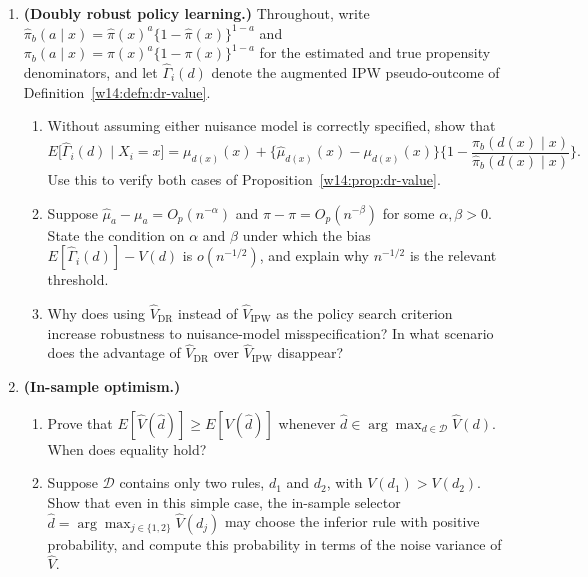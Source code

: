 \documentclass[master.tex]{subfiles}
\begin{document}
\begin{enumerate}
    \item \textbf{(Doubly robust policy learning.)}
    Throughout, write \(\hat\pi_b(a\mid x)=\hat\pi(x)^a\{1-\hat\pi(x)\}^{1-a}\)
    and \(\pi_b(a\mid x)=\pi(x)^a\{1-\pi(x)\}^{1-a}\) for the estimated and
    true propensity denominators, and let \(\hat\Gamma_i(d)\) denote the
    augmented IPW pseudo-outcome of Definition~\ref{w14:defn:dr-value}.
    \begin{enumerate}
        \item[(a)] Without assuming either nuisance model is correctly
            specified, show that
            \[
            E\bigl[\hat\Gamma_i(d)\mid X_i=x\bigr]
            = \mu_{d(x)}(x)
              + \bigl\{\hat\mu_{d(x)}(x)-\mu_{d(x)}(x)\bigr\}
                \biggl\{1-\frac{\pi_b(d(x)\mid x)}{\hat\pi_b(d(x)\mid x)}\biggr\}.
            \]
            Use this to verify both cases of
            Proposition~\ref{w14:prop:dr-value}.
        \item[(b)] Suppose \(\hat\mu_a-\mu_a=O_p(n^{-\alpha})\) and
            \(\hat\pi-\pi=O_p(n^{-\beta})\) for some \(\alpha,\beta>0\).
            State the condition on \(\alpha\) and \(\beta\) under which the
            bias \(E[\hat\Gamma_i(d)]-V(d)\) is \(o(n^{-1/2})\), and explain
            why \(n^{-1/2}\) is the relevant threshold.
        \item[(c)] Why does using \(\widehat V_{\mathrm{DR}}\) instead of
            \(\widehat V_{\mathrm{IPW}}\) as the policy search criterion
            increase robustness to nuisance-model misspecification? In what
            scenario does the advantage of \(\widehat V_{\mathrm{DR}}\) over
            \(\widehat V_{\mathrm{IPW}}\) disappear?
    \end{enumerate}

    \item \textbf{(In-sample optimism.)}
    \begin{enumerate}
        \item[(a)] Prove that \(E[\widehat V(\hat d)]\geq E[V(\hat d)]\)
            whenever \(\hat d\in\arg\max_{d\in\mathcal D}\widehat V(d)\).
            When does equality hold?
        \item[(b)] Suppose \(\mathcal D\) contains only two rules,
            \(d_1\) and \(d_2\), with \(V(d_1)>V(d_2)\). Show that even
            in this simple case, the in-sample selector
            \(\hat d = \arg\max_{j\in\{1,2\}}\widehat V(d_j)\) may choose
            the inferior rule with positive probability, and compute this
            probability in terms of the noise variance of \(\widehat V\).
    \end{enumerate}

\end{enumerate}

\ifSubfilesClassLoaded{%
  
  
}{}
\end{document}
